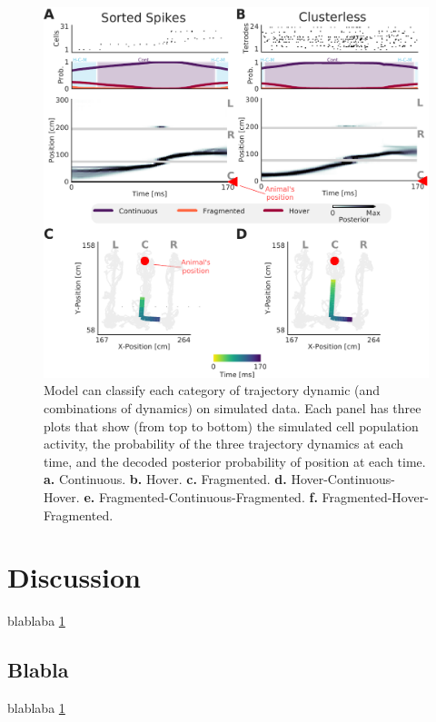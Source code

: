 \documentclass[times, twoside, watermark]{zHenriquesLab-StyleBioRxiv}
\begin{document}
\begin{figure}%
\centering
\includegraphics[width=1.0\linewidth]{figures/Figure2/Figure2_v3.pdf}
\caption{Model can classify each category of trajectory dynamic (and combinations of dynamics) on simulated data. Each panel has three plots that show (from top to bottom) the simulated cell population activity, the probability of the three trajectory dynamics at each time, and the decoded posterior probability of position at each time. \textbf{a.} Continuous. \textbf{b.} Hover. \textbf{c.} Fragmented. \textbf{d.} Hover-Continuous-Hover. \textbf{e.} Fragmented-Continuous-Fragmented. \textbf{f.} Fragmented-Hover-Fragmented.}
\label{fig:computerNo}
\end{figure}

\section*{Discussion}

blablaba \ref{fig:computerNo} 
\blindtext

\subsection*{Blabla} 
\blindtext


blablaba \ref{fig:computerNo}
\blindtext

\begin{acknowledgements}
\blindtext
\end{acknowledgements}
\end{document}
